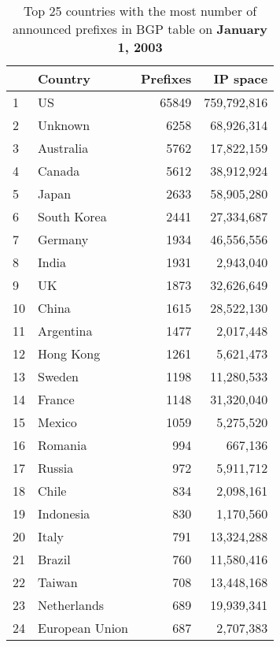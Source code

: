 \clearpage

\begin{table}[p]
	\begin{center}
	\caption{Top 25 countries with the most number of announced prefixes in BGP table on \textbf{January 1, 2003}}
	\label{tab:top25 bgp prefixes 2003}
	\begin{tabular}{|l||l|r|r|}
		\hline
		&      \bf Country		&    Prefixes   &       IP space 		\tabularnewline \hline 
1       &       US      		&       65849   &       759,792,816     \tabularnewline \hline
2       &       Unknown			&       6258    &       68,926,314      \tabularnewline \hline
3       &       Australia       &       5762    &       17,822,159      \tabularnewline \hline
4       &       Canada  		&       5612    &       38,912,924      \tabularnewline \hline
5       &       Japan   		&       2633    &       58,905,280      \tabularnewline \hline
6       &       South Korea     &       2441    &       27,334,687      \tabularnewline \hline
7       &       Germany			&       1934    &       46,556,556      \tabularnewline \hline
8       &       India  			&       1931    &       2,943,040       \tabularnewline \hline
9       &       UK     			&       1873    &       32,626,649      \tabularnewline \hline
10      &       China  			&       1615    &       28,522,130      \tabularnewline \hline
11      &       Argentina       &       1477    &       2,017,448       \tabularnewline \hline
12      &       Hong Kong       &       1261    &       5,621,473       \tabularnewline \hline
13      &       Sweden  		&       1198    &       11,280,533      \tabularnewline \hline
14      &       France  		&       1148    &       31,320,040      \tabularnewline \hline
15      &       Mexico  		&       1059    &       5,275,520       \tabularnewline \hline
16      &       Romania 		&       994     &       667,136 		\tabularnewline \hline
17      &       Russia  		&       972     &       5,911,712       \tabularnewline \hline
18      &       Chile   		&       834     &       2,098,161       \tabularnewline \hline
19      &       Indonesia       &       830     &       1,170,560       \tabularnewline \hline
20      &       Italy   		&       791     &       13,324,288      \tabularnewline \hline
21      &       Brazil  		&       760     &       11,580,416      \tabularnewline \hline
22      &       Taiwan  		&       708     &       13,448,168      \tabularnewline \hline
23      &       Netherlands     &       689     &       19,939,341      \tabularnewline \hline
24      &       European Union  &       687     &       2,707,383       \tabularnewline \hline

\end{tabular}
\end{center}
\end{table}
